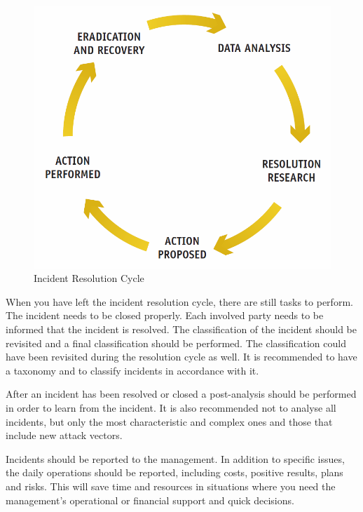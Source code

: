 \begin{figure}[h]
\begin{center}
\includegraphics[scale=0.4]{IncidentResolutionCycle.png}
\caption[ENISA Incident Resolution Cycle]{Incident Resolution Cycle \cite{enisaGuide}}
\label{fig:IncidentResolutionCycle}
\end{center}
\end{figure}

When you have left the incident resolution cycle, there are still tasks to perform. The incident needs to be closed properly. Each involved party needs to be informed that the incident is resolved. The classification of the incident should be revisited and a final classification should be performed. The classification could have been revisited during the resolution cycle as well. It is recommended to have a taxonomy and to classify incidents in accordance with it.

After an incident has been resolved or closed a post-analysis should be performed in order to learn from the incident. It is also recommended not to analyse all incidents, but only the most characteristic and complex ones and those that include new attack vectors. 

Incidents should be reported to the management. In addition to specific issues, the daily operations should be reported, including costs, positive results, plans and risks. This will save time and resources in situations where you need the management's operational or financial support and quick decisions.



